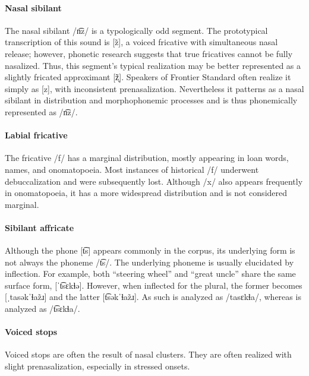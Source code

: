 \paragraph{Nasal sibilant}
The nasal sibilant /n͡z/ is a typologically odd segment. The prototypical transcription of this sound is [z̃], a voiced fricative with simultaneous nasal release; however, phonetic research suggests that true fricatives cannot be fully nasalized. Thus, this segment's typical realization may be better represented as a slightly fricated approximant [z̞̃]. Speakers of Frontier Standard often realize it simply as [z], with inconsistent prenasalization. %
Nevertheless it patterns as a nasal sibilant in distribution and morphophonemic processes and is thus phonemically represented as /n͡z/.

\paragraph{Labial fricative}
The fricative /f/ has a marginal distribution, mostly appearing in loan words, names, and onomatopoeia. Most instances of historical /f/ underwent debuccalization and were subsequently lost. Although /x/ also appears frequently in onomatopoeia, it has a more widespread distribution and is not considered marginal.

\paragraph{Sibilant affricate}
Although the phone [t͡s] appears commonly in the corpus, its underlying form is not always the phoneme /t͡s/.  The underlying phoneme is usually elucidated by inflection. For example, both  “steering wheel” and  “great uncle” share the same surface form, [ˈt͡sɛkɬə]. However, when inflected for the plural, the former becomes [ˌtasəkˈɬaz̃ɹ] and the latter [t͡səkˈɬaz̃ɹ]. As such  is analyzed as /tasɛkɬa/, whereas  is analyzed as /t͡sɛkɬa/. 

\paragraph{Voiced stops}
Voiced stops are often the result of nasal clusters.  They are often realized with slight prenasalization, especially in stressed onsets.

